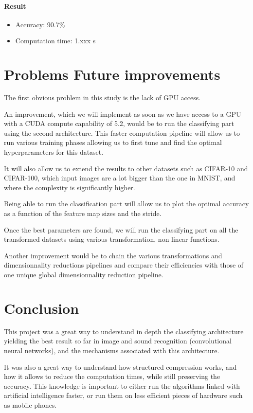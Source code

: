 \documentclass[11pt,a4paper]{article}
\begin{document}
	 \paragraph{Result}
	 \begin{itemize}
			\item Accuracy: 90.7\%
			\item Computation time: 1.xxx s
	\end{itemize}



	
	
	\section{Problems Future improvements}
	The first obvious problem in this study is the lack of GPU access.
	
	
	An improvement, which we will implement as soon as we have access to a GPU with a CUDA compute capability of 5.2, would be to run the classifying part using the second architecture.
	This faster computation pipeline will allow us to run various training phases allowing us to first tune and find the optimal hyperparameters for this dataset.
	
	
	It will also allow us to extend the results to other datasets such as CIFAR-10 and CIFAR-100, which input images are a lot bigger than the one in MNIST, and where the complexity is significantly higher.
	
	
	Being able to run the classification part will allow us to plot the optimal accuracy as a function of the feature map sizes and the stride.
	
	
Once the best parameters are found, we will run the classifying part on all the transformed datasets using various transformation, non linear functions.
	
	Another improvement would be to chain the various transformations and dimensionnality reductions pipelines and compare their efficiencies with those of one unique global dimensionnality reduction pipeline.
	
	
	\section{Conclusion}
This project was a great way to understand in depth the classifying architecture yielding the best result so far in image and sound recognition (convolutional neural networks), and the mechanisms associated with this architecture.

It was also a great way to understand how structured compression works, and how it allows to reduce the computation times, while still preserving the accuracy. This knowledge is important to either run the algorithms linked with artificial intelligence faster, or run them on less efficient pieces of hardware such as mobile phones.
\end{document}
